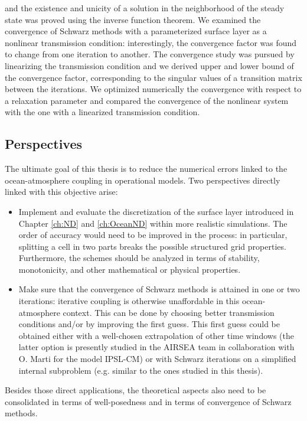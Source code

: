 and the existence and unicity of a solution in the neighborhood
of the steady state was proved using the inverse function theorem.
We examined the convergence of Schwarz methods with a parameterized
surface layer as a nonlinear transmission condition:
interestingly, the convergence factor was found to change from
one iteration to another.
The convergence study was pursued by linearizing the transmission
condition and we derived upper and lower bound of the
convergence factor,
corresponding to the singular values of a transition matrix between
the iterations.
We optimized numerically the convergence with respect to a relaxation
parameter and compared the convergence of the nonlinear system
with the one with a linearized transmission condition.
\subsection*{Perspectives}
The ultimate goal of this thesis is
to reduce the numerical errors linked to the ocean-atmosphere
coupling in operational models. Two perspectives
directly linked with this objective arise:
\begin{itemize}
	\item Implement and evaluate the discretization of the
		surface layer introduced in Chapter \ref{ch:ND} and
	\ref{ch:OceanND} within more realistic simulations.
	The order of accuracy would need to be improved in the
	process: in particular, splitting a cell in two parts
	breaks the possible structured grid properties.
	Furthermore, the schemes should be analyzed in terms of
	stability, monotonicity, and other mathematical or physical
		properties.
	\item Make sure that the convergence of Schwarz methods
	is attained in one or two iterations: iterative coupling is
	otherwise unaffordable in this ocean-atmosphere context.
	This can be done by choosing better transmission
	conditions and/or by improving the first guess.
	This first guess could be obtained either with a
	well-chosen extrapolation of other time windows (the latter option
	is presently studied in the AIRSEA team in collaboration
	with O. Marti for the model IPSL-CM) or
	with Schwarz iterations on a simplified internal subproblem (e.g.
	similar to the ones studied in this thesis).
\end{itemize}
\par
Besides those direct applications, the theoretical aspects
also need to be consolidated in terms of well-posedness
and in terms of convergence of Schwarz methods.
